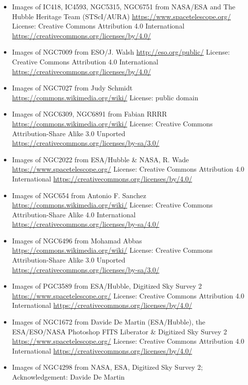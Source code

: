 \begin{itemize}
	 from Robert Eder, post-processing: Sun Shuwei
	 \url{https://commons.wikimedia.org/wiki/}
	 License: Creative Commons Attribution-Share Alike 4.0 International \url{https://creativecommons.org/licenses/by-sa/4.0/}
\item Images of IC418, IC4593, NGC5315, NGC6751
	 from NASA/ESA and The Hubble Heritage Team (STScI/AURA)
	 \url{https://www.spacetelescope.org/}
	 License: Creative Commons Attribution 4.0 International \url{https://creativecommons.org/licenses/by/4.0/}
\item Images of NGC7009 from ESO/J. Walsh
	 \url{http://eso.org/public/}
	 License: Creative Commons Attribution 4.0 International \url{https://creativecommons.org/licenses/by/4.0/}
\item Images of NGC7027 from Judy Schmidt
	 \url{https://commons.wikimedia.org/wiki/}
	 License: public domain 
\item Images of NGC6309, NGC6891 from Fabian RRRR
	 \url{https://commons.wikimedia.org/wiki/}
	 License: Creative Commons Attribution-Share Alike 3.0 Unported \url{https://creativecommons.org/licenses/by-sa/3.0/}
\item Images of NGC2022 from ESA/Hubble \& NASA, R. Wade
	 \url{https://www.spacetelescope.org/}
	 License: Creative Commons Attribution 4.0 International \url{https://creativecommons.org/licenses/by/4.0/}
\item Images of NGC654 from Antonio F. Sanchez
	 \url{https://commons.wikimedia.org/wiki/}
	 License: Creative Commons Attribution-Share Alike 4.0 International \url{https://creativecommons.org/licenses/by-sa/4.0/}
\item Images of NGC6496
	 from Mohamad Abbas
	 \url{https://commons.wikimedia.org/wiki/}
	 License: Creative Commons Attribution-Share Alike 3.0 Unported \url{https://creativecommons.org/licenses/by-sa/3.0/}
\item Images of PGC3589
	 from ESA/Hubble, Digitized Sky Survey 2
	 \url{https://www.spacetelescope.org/}
	 License: Creative Commons Attribution 4.0 International \url{https://creativecommons.org/licenses/by/4.0/}
\item Images of NGC1672
	 from Davide De Martin (ESA/Hubble), the ESA/ESO/NASA Photoshop FITS Liberator \& Digitized Sky Survey 2
	 \url{https://www.spacetelescope.org/}
	 License: Creative Commons Attribution 4.0 International \url{https://creativecommons.org/licenses/by/4.0/}
\item Images of NGC4298
	 from NASA, ESA, Digitized Sky Survey 2; Acknowledgement: Davide De Martin

\end{itemize}
